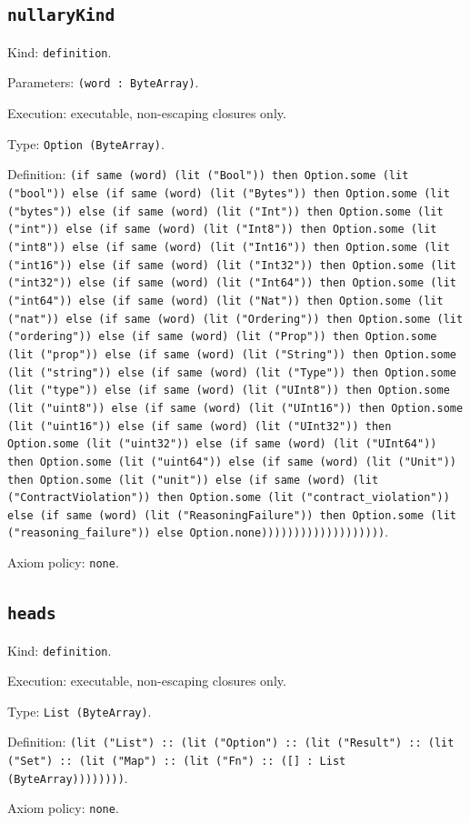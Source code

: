 \documentclass[11pt]{article}
\begin{document}
\subsection*{\texttt{nullaryKind}}
\noindent Kind: \texttt{definition}.\par
\noindent Parameters: \texttt{(word : ByteArray)}.\par
\noindent Execution: executable, non-escaping closures only.\par
\noindent Type: \texttt{Option (ByteArray)}.\par
\noindent Definition: \texttt{(if same (word) (lit ("Bool")) then Option.some (lit ("bool")) else (if same (word) (lit ("Bytes")) then Option.some (lit ("bytes")) else (if same (word) (lit ("Int")) then Option.some (lit ("int")) else (if same (word) (lit ("Int8")) then Option.some (lit ("int8")) else (if same (word) (lit ("Int16")) then Option.some (lit ("int16")) else (if same (word) (lit ("Int32")) then Option.some (lit ("int32")) else (if same (word) (lit ("Int64")) then Option.some (lit ("int64")) else (if same (word) (lit ("Nat")) then Option.some (lit ("nat")) else (if same (word) (lit ("Ordering")) then Option.some (lit ("ordering")) else (if same (word) (lit ("Prop")) then Option.some (lit ("prop")) else (if same (word) (lit ("String")) then Option.some (lit ("string")) else (if same (word) (lit ("Type")) then Option.some (lit ("type")) else (if same (word) (lit ("UInt8")) then Option.some (lit ("uint8")) else (if same (word) (lit ("UInt16")) then Option.some (lit ("uint16")) else (if same (word) (lit ("UInt32")) then Option.some (lit ("uint32")) else (if same (word) (lit ("UInt64")) then Option.some (lit ("uint64")) else (if same (word) (lit ("Unit")) then Option.some (lit ("unit")) else (if same (word) (lit ("ContractViolation")) then Option.some (lit ("contract\_violation")) else (if same (word) (lit ("ReasoningFailure")) then Option.some (lit ("reasoning\_failure")) else Option.none)))))))))))))))))))}.\par
\noindent Axiom policy: \texttt{none}.\par
\subsection*{\texttt{heads}}
\noindent Kind: \texttt{definition}.\par
\noindent Execution: executable, non-escaping closures only.\par
\noindent Type: \texttt{List (ByteArray)}.\par
\noindent Definition: \texttt{(lit ("List") :: (lit ("Option") :: (lit ("Result") :: (lit ("Set") :: (lit ("Map") :: (lit ("Fn") :: ([] : List (ByteArray))))))))}.\par
\noindent Axiom policy: \texttt{none}.\par
\end{document}
